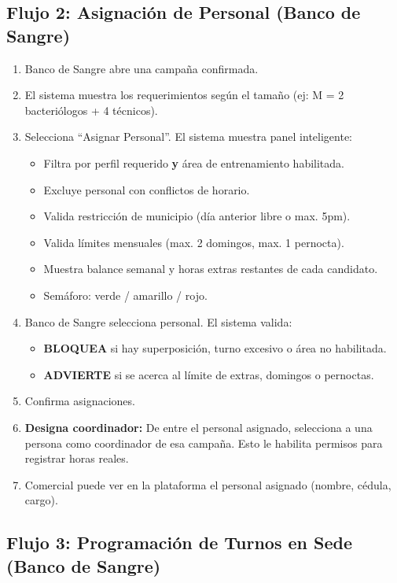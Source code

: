 \documentclass[10pt,a4paper]{article}
\begin{document}
\subsection{Flujo 2: Asignaci\'{o}n de Personal (Banco de Sangre)}

\begin{enumerate}[leftmargin=2em]
    \item Banco de Sangre abre una campaña confirmada.
    \item El sistema muestra los requerimientos seg\'{u}n el tamaño (ej: M = 2 bacteri\'{o}logos + 4 t\'{e}cnicos).
    \item Selecciona ``Asignar Personal''. El sistema muestra panel inteligente:
    \begin{itemize}
        \item Filtra por perfil requerido \textbf{y} \'{a}rea de entrenamiento habilitada.
        \item Excluye personal con conflictos de horario.
        \item Valida restricci\'{o}n de municipio (d\'{i}a anterior libre o max. 5pm).
        \item Valida l\'{i}mites mensuales (max. 2 domingos, max. 1 pernocta).
        \item Muestra balance semanal y horas extras restantes de cada candidato.
        \item Sem\'{a}foro: verde / amarillo / rojo.
    \end{itemize}
    \item Banco de Sangre selecciona personal. El sistema valida:
    \begin{itemize}
        \item \textbf{BLOQUEA} si hay superposici\'{o}n, turno excesivo o \'{a}rea no habilitada.
        \item \textbf{ADVIERTE} si se acerca al l\'{i}mite de extras, domingos o pernoctas.
    \end{itemize}
    \item Confirma asignaciones.
    \item \textbf{Designa coordinador:} De entre el personal asignado, selecciona a una persona como coordinador de esa campaña. Esto le habilita permisos para registrar horas reales.
    \item Comercial puede ver en la plataforma el personal asignado (nombre, c\'{e}dula, cargo).
\end{enumerate}

\subsection{Flujo 3: Programaci\'{o}n de Turnos en Sede (Banco de Sangre)}
\end{document}
